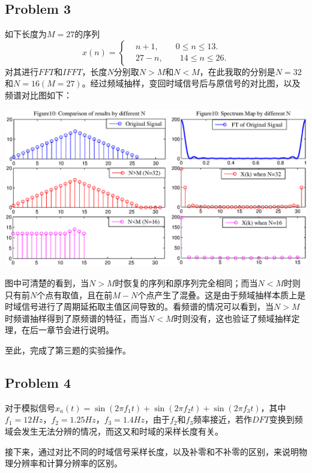 \documentclass[a4paper,11pt,onecolumn,twoside]{article}
\begin{document}
\subsection{Problem 3}
如下长度为$M=27$的序列
\begin{equation}
x(n) =
\left\{
\begin{aligned}
& n+1, \qquad 0 \leq n \leq 13. \\
& 27-n, \qquad 14 \leq n \leq 26.
\end{aligned}
\right.
\end{equation}
对其进行$FFT$和$IFFT$，长度$N$分别取$N>M$和$N<M$，在此我取的分别是$N=32$和$N=16(M=27)$。经过频域抽样，变回时域信号后与原信号的对比图，以及频谱对比图如下：
\begin{center}
    \includegraphics[width=1\textwidth]{fig10.eps}
\end{center}
图中可清楚的看到，当$N>M$时恢复的序列和原序列完全相同；而当$N<M$时则只有前$N$个点有取值，且在前$M-N$个点产生了混叠。这是由于频域抽样本质上是时域信号进行了周期延拓取主值区间导致的。看频谱的情况可以看到，当$N>M$时频谱抽样得到了原频谱的特征，而当$N<M$时则没有，这也验证了频域抽样定理，在后一章节会进行说明。

至此，完成了第三题的实验操作。

\subsection{Problem 4}
对于模拟信号$x_a(t)=\sin(2\pi f_1t)+\sin(2\pi f_2t)+\sin(2\pi f_3t)$，其中$f_1=12Hz$，$f_2=1.25Hz$，$f_3=1.4Hz$，由于$f_2$和$f_3$频率接近，若作$DFT$变换到频域会发生无法分辨的情况，而这又和时域的采样长度有关。

接下来，通过对比不同的时域信号采样长度，以及补零和不补零的区别，来说明物理分辨率和计算分辨率的区别。
\end{document}
